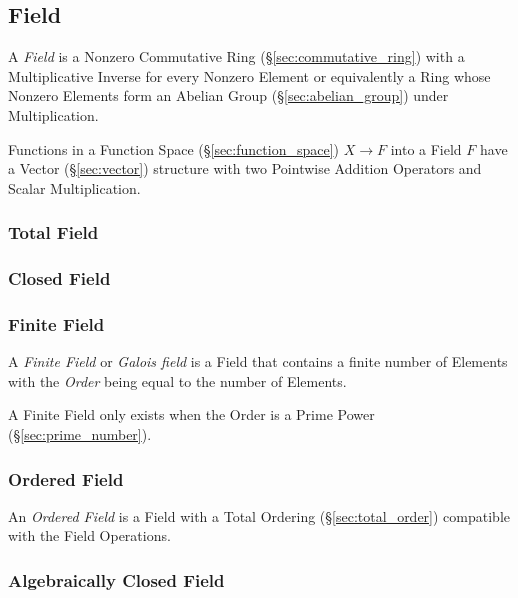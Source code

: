 \subsection{Field}\label{sec:field}

A \emph{Field} is a Nonzero Commutative Ring
(\S\ref{sec:commutative_ring}) with a Multiplicative Inverse for every
Nonzero Element or equivalently a Ring whose Nonzero Elements form an
Abelian Group (\S\ref{sec:abelian_group}) under Multiplication.

Functions in a Function Space (\S\ref{sec:function_space}) $X
\rightarrow F$ into a Field $F$ have a Vector (\S\ref{sec:vector})
structure with two Pointwise Addition Operators and Scalar
Multiplication.



\subsubsection{Total Field}\label{sec:total_field}

\subsubsection{Closed Field}\label{sec:closed_field}

\subsubsection{Finite Field}\label{sec:finite_field}

A \emph{Finite Field} or \emph{Galois field} is a Field that contains
a finite number of Elements with the \emph{Order} being equal to the
number of Elements.

A Finite Field only exists when the Order is a Prime Power
(\S\ref{sec:prime_number}).



\subsubsection{Ordered Field}\label{sec:ordered_field}

An \emph{Ordered Field} is a Field with a Total Ordering
(\S\ref{sec:total_order}) compatible with the Field Operations.



\subsubsection{Algebraically Closed Field}
\label{sec:algebraically_closed}



